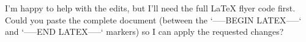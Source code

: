 I’m happy to help with the edits, but I’ll need the full LaTeX flyer code first. Could you paste the complete document (between the `-----BEGIN LATEX-----` and `-----END LATEX-----` markers) so I can apply the requested changes?